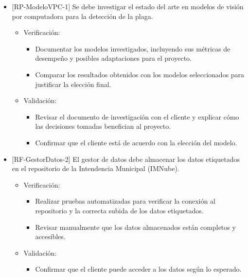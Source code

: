 \documentclass[
11pt, %
]{charter}
\begin{document}
\begin{itemize}[label={}]
  \item {[}RP-ModeloVPC-1{]} Se debe investigar el estado del arte en modelos de visión por computadora para la detección de la plaga.
        \begin{itemize}
          \item Verificación:
                \begin{itemize}
                  \item Documentar los modelos investigados, incluyendo sus métricas de desempeño y posibles adaptaciones para el proyecto.
                  \item Comparar los resultados obtenidos con los modelos seleccionados para justificar la elección final.
                \end{itemize}
          \item Validación:
                \begin{itemize}
                  \item Revisar el documento de investigación con el cliente y explicar cómo las decisiones tomadas benefician al proyecto.
                  \item Confirmar que el cliente está de acuerdo con la elección del modelo.
                \end{itemize}
        \end{itemize}

  \item {[}RF-GestorDatos-2{]} El gestor de datos debe almacenar los datos etiquetados en el repositorio de la Intendencia Municipal (IMNube).
        \begin{itemize}
          \item Verificación:
                \begin{itemize}
                  \item Realizar pruebas automatizadas para verificar la conexión al repositorio y la correcta subida de los datos etiquetados.
                  \item Revisar manualmente que los datos almacenados están completos y accesibles.
                \end{itemize}
          \item Validación:
                \begin{itemize}
                  \item Confirmar que el cliente puede acceder a los datos según lo esperado.
                \end{itemize}
        \end{itemize}


\end{itemize}
\end{document}
